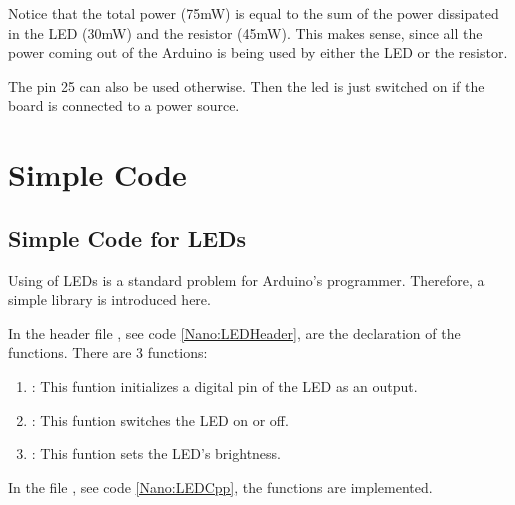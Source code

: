 \medskip

Notice that the total power (75mW) is equal to the sum of the power dissipated in the LED (30mW) and the resistor (45mW). This makes sense, since all the power coming out of the Arduino is being used by either the LED or the resistor.


\medskip

The pin 25 can also be used otherwise. Then the \ac{led} is just switched on if the board is connected to a power source. %


%

\section{Simple Code}

\subsection{Simple Code for LEDs}

Using of LEDs is a standard problem for Arduino's programmer. Therefore, a simple library is introduced here.

\medskip

In the header file , see code \ref{Nano:LEDHeader}, are the declaration of the functions. There are 3 functions:

\begin{enumerate}
    \item {}: This funtion initializes a digital pin of the LED as an output.
    \item {}: This funtion switches the LED  on or off.
    \item {}: This funtion sets the LED's brightness.
\end{enumerate}

{
    \label{Nano:LEDHeader}
}

In the file , see code \ref{Nano:LEDCpp}, the functions are implemented.

